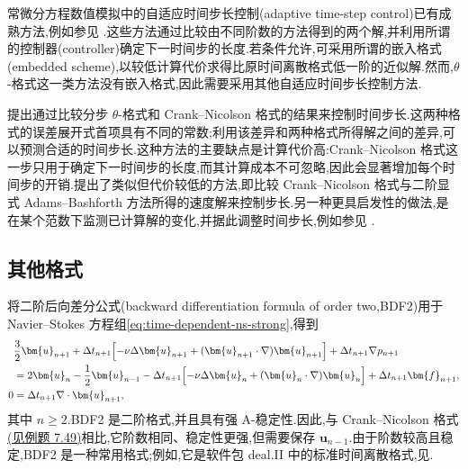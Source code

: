 \begin{note}[自适应时间步长控制]
\label{note:adaptive-time-step-control}
常微分方程数值模拟中的自适应时间步长控制(adaptive time-step control)已有成熟方法,例如参见 \textcite[第 II.4 节]{HairerNoersettWanner1993}.这些方法通过比较由不同阶数的方法得到的两个解,并利用所谓的控制器(controller)确定下一时间步的长度.若条件允许,可采用所谓的嵌入格式(embedded scheme),以较低计算代价求得比原时间离散格式低一阶的近似解.然而,$\theta$-格式这一类方法没有嵌入格式,因此需要采用其他自适应时间步长控制方法.

\textcite{Turek1999}提出通过比较分步 $\theta$-格式和 Crank--Nicolson 格式的结果来控制时间步长.这两种格式的误差展开式首项具有不同的常数;利用该差异和两种格式所得解之间的差异,可以预测合适的时间步长.这种方法的主要缺点是计算代价高:Crank--Nicolson 格式这一步只用于确定下一时间步的长度,而其计算成本不可忽略,因此会显著增加每个时间步的开销.\textcite{KayGreshoGriffithsSilvester2010}提出了类似但代价较低的方法,即比较 Crank--Nicolson 格式与二阶显式 Adams--Bashforth 方法所得的速度解来控制步长.另一种更具启发性的做法,是在某个范数下监测已计算解的变化,并据此调整时间步长,例如参见 \textcite{BerroneMarro2009}.
\end{note}
\subsection{其他格式}\label{subsec:time-dependent-other-schemes}

\begin{note}
\label{note:bdf2-scheme}
将二阶后向差分公式(backward differentiation formula of order two,BDF2)用于 Navier--Stokes 方程组\cref{eq:time-dependent-ns-strong},得到
\begin{equation}\label{eq:bdf2-time-discretization}
\begin{aligned}
  &\frac32\bm{u}_{n+1}
   +\Delta t_{n+1}\Bigl[-\nu\Delta\bm{u}_{n+1}
       +(\bm{u}_{n+1}\cdot\nabla)\bm{u}_{n+1}\Bigr]
   +\Delta t_{n+1}\nabla p_{n+1}\\
  &=2\bm{u}_n-\frac12\bm{u}_{n-1}
    -\Delta t_{n+1}\Bigl[-\nu\Delta\bm{u}_n
       +(\bm{u}_n\cdot\nabla)\bm{u}_n\Bigr]
    +\Delta t_{n+1}\bm{f}_{n+1},\\
  0&=\Delta t_{n+1}\nabla\cdot\bm{u}_{n+1},
\end{aligned}
\end{equation}
其中 $n\ge2$.BDF2 是二阶格式,并且具有强 A-稳定性.因此,与 Crank--Nicolson 格式\hyperref[ex:time-dependent-crank-nicolson]{(见例题 7.49)}相比,它阶数相同、稳定性更强,但需要保存 $\bm{u}_{n-1}$.由于阶数较高且稳定,BDF2 是一种常用格式;例如,它是软件包 deal.II 中的标准时间离散格式,见\textcite{BangerthHartmannKanschat2007}.
\end{note}

